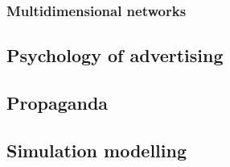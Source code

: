 \subsubsection{Multidimensional networks}


\subsection{Psychology of advertising}

\subsection{Propaganda} 

\subsection{Simulation modelling}